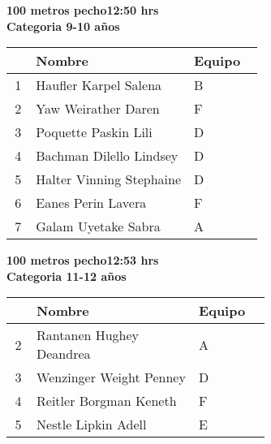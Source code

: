 \begin{minipage}{0.95\linewidth}\vspace{0.5cm} 
\begin{flushleft}
\textbf{
\hspace{-0.15cm}100 metros pecho\hspace{1.5cm}12:50 hrs \\Categoria 9-10 años}\vspace{-0.2cm} 
\end{flushleft}
\begin{tabular}{cp{0.63\linewidth}l}
\hline
& \textbf{Nombre} & \textbf{Equipo} \\ \hline
1 & Haufler Karpel Salena & B \\ 
2 & Yaw Weirather Daren & F \\ 
3 & Poquette Paskin Lili & D \\ 
4 & Bachman Dilello Lindsey & D \\ 
5 & Halter Vinning Stephaine & D \\ 
6 & Eanes Perin Lavera & F \\ 
7 & Galam Uyetake Sabra & A \\ 
\end{tabular}
\end{minipage}
\begin{minipage}{0.95\linewidth}\vspace{0.5cm} 
\begin{flushleft}
\textbf{
\hspace{-0.15cm}100 metros pecho\hspace{1.5cm}12:53 hrs \\Categoria 11-12 años}\vspace{-0.2cm} 
\end{flushleft}
\begin{tabular}{cp{0.63\linewidth}l}
\hline
& \textbf{Nombre} & \textbf{Equipo} \\ \hline
2 & Rantanen Hughey Deandrea & A \\ 
3 & Wenzinger Weight Penney & D \\ 
4 & Reitler Borgman Keneth & F \\ 
5 & Nestle Lipkin Adell & E \\ 
\end{tabular}
\end{minipage}
